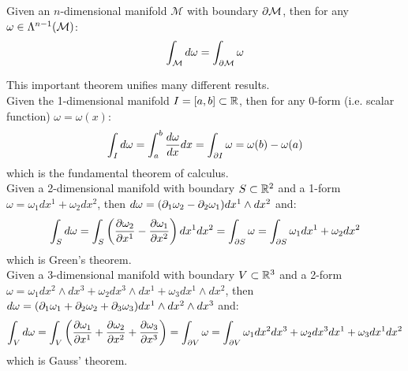 \begin{theorem}[Stokes]
  Given an $ n $-dimensional manifold $ \mathcal{M} $ with boundary $ \partial \mathcal{M} $, then for any $ \omega \in\Lambda^{n-1}(\mathcal{M}) $:
  \begin{equation}
    \int_{\mathcal{M}} d\omega = \int_{\partial \mathcal{M}} \omega
    \label{eq:2.48}
  \end{equation}
\end{theorem}

This important theorem unifies many different results.\\
Given the 1-dimensional manifold $ I = [a,b] \subset \mathbb{R} $, then for any $ 0 $-form (i.e. scalar function) $ \omega = \omega(x) $:
\begin{equation*}
  \int_{I} d\omega = \int_a^b \frac{d\omega}{dx} dx = \int_{\partial I} \omega = \omega(b) - \omega(a)
\end{equation*}
which is the fundamental theorem of calculus.\\
Given a 2-dimensional manifold with boundary $ S \subset \mathbb{R}^2 $ and a 1-form $ \omega = \omega_1 dx^1 + \omega_2 dx^2 $, then $ d\omega = (\partial_1 \omega_2 - \partial_2 \omega_1) dx^1 \wedge dx^2 $ and:
\begin{equation*}
  \int_{S} d\omega = \int_{S} \left( \frac{\partial \omega_2}{\partial x^1} - \frac{\partial \omega_1}{\partial x^2} \right) dx^1 dx^2 = \int_{\partial S} \omega = \int_{\partial S} \omega_1 dx^1 + \omega_2 dx^2
\end{equation*}
which is Green's theorem.\\
Given a 3-dimensional manifold with boundary $ V \subset \mathbb{R}^3 $ and a 2-form $ \omega = \omega_1 dx^2 \wedge dx^3 + \omega_2 dx^3 \wedge dx^1 + \omega_3 dx^1 \wedge dx^2 $, then $ d\omega = (\partial_1 \omega_1 + \partial_2 \omega_2 + \partial_3 \omega_3) dx^1 \wedge dx^2 \wedge dx^3 $ and:
\begin{equation*}
  \int_{V} d\omega = \int_{V} \left( \frac{\partial \omega_1}{\partial x^1} + \frac{\partial \omega_2}{\partial x^2} + \frac{\partial \omega_3}{\partial x^3} \right) = \int_{\partial V} \omega = \int_{\partial V} \omega_1 dx^2 dx^3 + \omega_2 dx^3 dx^1 + \omega_3 dx^1 dx^2
\end{equation*}
which is Gauss' theorem.










